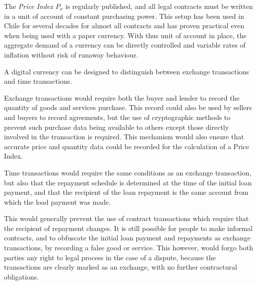 The \emph{Price Index} $P_x$ is regularly published, and all legal contracts must be written in a
unit of account of constant purchasing power. This setup has been used in Chile for several decades
for almost all contracts and has proven practical even when being used with a paper currency. With
thus unit of account in place, the aggregate demand of a currency can be directly controlled and
variable rates of inflation without risk of runaway behaviour. 

A digital currency can be designed to distinguish between exchange transactions and time
transactions.

Exchange transactions would require both the buyer and lender to record the quantity of goods and
services purchase. This record could also be used by sellers and buyers to record agreements, but
the use of cryptographic methods to prevent such purchase data being available to others except
those directly involved in the transaction is required. This mechanism would also ensure that
accurate price and quantity data could be recorded for the calculation of a Price Index. 

Time transactions would require the same conditions as an exchange transaction, but also that the
repayment schedule is determined at the time of the initial loan payment, and that the recipient of
the loan repayment is the same account from which the load payment was made.

This would generally prevent the use of contract transactions which require that the recipient of
repayment changes. It is still possible for people to make informal contracts, and to obfuscate the
initial loan payment and repayments as exchange transactions, by recording a false good or service.
This however, would forgo both parties any right to legal process in the case of a dispute, because
the transactions are clearly marked as an exchange, with no further contractural obligations.












